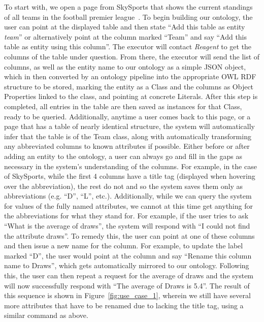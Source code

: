 To start with, we open a page from SkySports that shows the current standings
of all teams in the football premier league~\cite{skysports_table}. To begin building
our ontology, the user can point at the displayed table and then state ``Add this table
as entity {\em team}'' or alternatively point at the column marked ``Team'' and say ``Add this
table as entity using this column''. The executor will contact \textit{Reagent} to get the columns
of the table under question. From there, the executor will send the list of columns, as well
as the entity name to our ontology as a simple JSON object, which in then converted by an
ontology pipeline into the appropriate OWL RDF structure to be stored, marking the entity as a 
Class and the columns as Object Properties linked to the class, and pointing at concrete 
Literals. After this step is completed, all entries in the table are then saved as instances
for that Class, ready to be queried. Additionally, anytime a user comes back to this page,
or a page that has a table of nearly identical structure, the system will automatically infer that the table
is of the Team class, along with automatically transforming any abbreviated columns to known
attributes if possible. Either before or after adding an entity to the ontology, a user can always go and
fill in the gaps as necessary in the system's understanding of the columns. For example, in the case of 
SkySports, while the first 4 columns have a title tag (displayed when hovering over the abbreviation), 
the rest do not and so the system saves them only as abbreviations (e.g. ``D'', ``L'', etc.). 
Additionally, while we can query the system for values of the fully named attributes, we cannot at this
time get anything for the abbreviations for what they stand for. For example, if the user
tries to ask ``What is the average of draws'', the system will respond with 
``I could not find the attribute draws''. To remedy this, the user can point at one of these
columns and then issue a new name for the column. For example, to update the
label marked ``D'', the user would point at the column and say ``Rename this column
name to Draws'', which gets automatically mirrored to our
ontology. Following this, the user can then repeat a request for the
average of draws and the system will now successfully respond with ``The average of Draws is 5.4''. The result of this sequence is shown in Figure~\ref{fig:use_case_1}, wherein we still have several more attributes that
have to be renamed due to lacking the title tag, using a similar command as
above.

